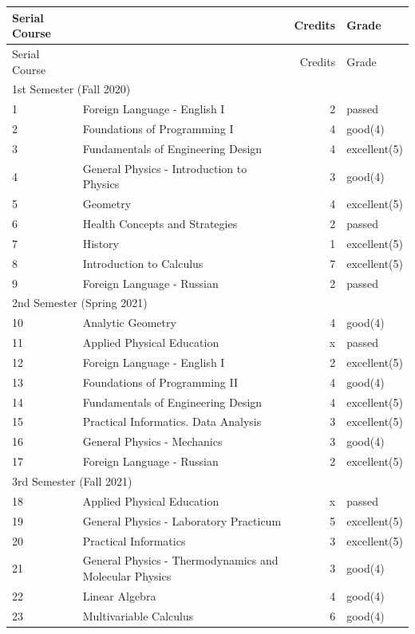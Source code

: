 \documentclass[a4paper, 11pt]{article}
\begin{document}
\begin{longtable}{p{} p{} r l}
Serial Course &  & Credits & Grade \\ \hline
\endfirsthead
Serial Course &  & Credits & Grade \\ \hline
\endhead
\multicolumn{4}{l}{1st Semester (Fall 2020)} \\ 
1 & Foreign Language - English I & 2 & passed \\
2 & Foundations of Programming I & 4 & good(4) \\
3 & Fundamentals of Engineering Design & 4 & excellent(5) \\
4 & General Physics - Introduction to Physics & 3 & good(4) \\
5 & Geometry & 4 & excellent(5) \\
6 & Health Concepts and Strategies & 2 & passed \\
7 & History & 1 & excellent(5) \\
8 & Introduction to Calculus & 7 & excellent(5) \\
9 & Foreign Language - Russian & 2 & passed \\
\multicolumn{4}{l}{2nd Semester (Spring 2021)} \\ 
10 & Analytic Geometry & 4 & good(4) \\
11 & Applied Physical Education & x & passed \\
12 & Foreign Language - English I & 2 & excellent(5) \\
13 & Foundations of Programming II & 4 & good(4) \\
14 & Fundamentals of Engineering Design & 4 & excellent(5) \\
15 & Practical Informatics. Data Analysis & 3 & excellent(5) \\
16 & General Physics - Mechanics & 3 & good(4) \\
17 & Foreign Language - Russian & 2 & excellent(5) \\
\multicolumn{4}{l}{3rd Semester (Fall 2021)} \\ 
18 & Applied Physical Education & x & passed \\
19 & General Physics - Laboratory Practicum & 5 & excellent(5) \\
20 & Practical Informatics & 3 & excellent(5) \\
21 & General Physics - Thermodynamics and Molecular Physics & 3 & good(4) \\
22 & Linear Algebra & 4 & good(4) \\
23 & Multivariable Calculus & 6 & good(4) \\

\end{longtable}
\end{document}
